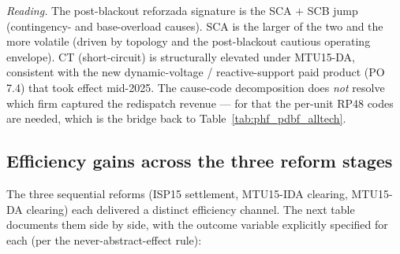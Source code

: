 \documentclass[11pt,a4paper]{article}
\begin{document}
\textit{Reading.} The post-blackout reforzada signature is the SCA $+$ SCB jump (contingency- and base-overload causes). SCA is the larger of the two and the more volatile (driven by topology and the post-blackout cautious operating envelope). CT (short-circuit) is structurally elevated under MTU15-DA, consistent with the new dynamic-voltage / reactive-support paid product (PO 7.4) that took effect mid-2025. The cause-code decomposition does \emph{not} resolve which firm captured the redispatch revenue --- for that the per-unit RP48 codes are needed, which is the bridge back to Table~\ref{tab:phf_pdbf_alltech}.

\subsection{Efficiency gains across the three reform stages}\label{sec:prov:full_cascade:efficiency}

The three sequential reforms (ISP15 settlement, MTU15-IDA clearing, MTU15-DA clearing) each delivered a distinct efficiency channel. The next table documents them side by side, with the outcome variable explicitly specified for each (per the never-abstract-effect rule):
\end{document}
